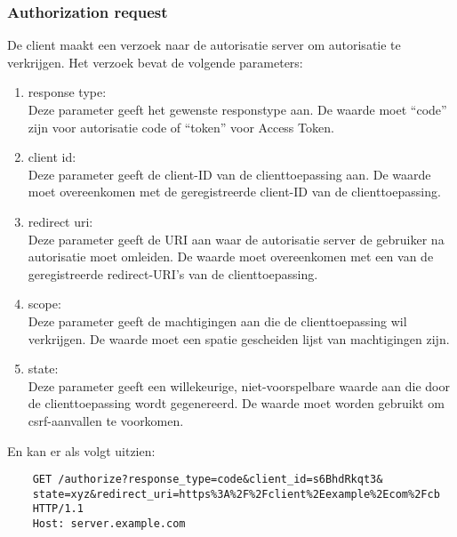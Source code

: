 \subsubsection{Authorization request}%
\label{subsubsec:authorization-request}
De client maakt een verzoek naar de autorisatie server om autorisatie te verkrijgen. Het verzoek bevat de volgende parameters:
\begin{enumerate}[label=\textbf{-}]
    \item response type: \\
    Deze parameter geeft het gewenste responstype aan. De waarde moet ``code'' zijn voor autorisatie code of ``token'' voor Access Token.
  
    \item client id: \\
    Deze parameter geeft de client-ID van de clienttoepassing aan. De waarde moet overeenkomen met de geregistreerde client-ID van de clienttoepassing.
  
    \item redirect uri: \\
    Deze parameter geeft de URI aan waar de autorisatie server de gebruiker na autorisatie moet omleiden. De waarde moet overeenkomen met een van de geregistreerde redirect-URI's van de clienttoepassing.
  
    \item scope: \\
    Deze parameter geeft de machtigingen aan die de clienttoepassing wil verkrijgen. De waarde moet een spatie gescheiden lijst van machtigingen zijn.
  
    \item state: \\
    Deze parameter geeft een willekeurige, niet-voorspelbare waarde aan die door de clienttoepassing wordt gegenereerd. De waarde moet worden gebruikt om \gls{csrf}-aanvallen te voorkomen.
  \end{enumerate}
  En kan er als volgt uitzien:
  \begin{verbatim}
    GET /authorize?response_type=code&client_id=s6BhdRkqt3&
    state=xyz&redirect_uri=https%3A%2F%2Fclient%2Eexample%2Ecom%2Fcb
    HTTP/1.1
    Host: server.example.com
  \end{verbatim}

